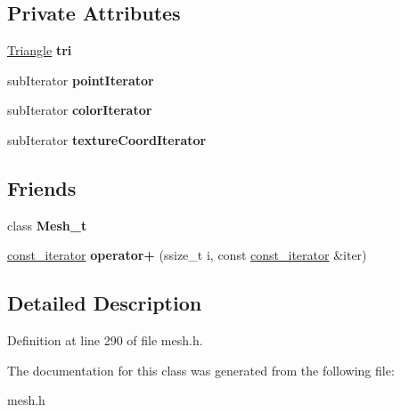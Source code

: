 \subsection*{Private Attributes}
\begin{DoxyCompactItemize}
\item 
\hypertarget{classMesh__t_1_1const__iterator_aa0ff7c5e1b1f15e37f6bf47ae48813bc}{\hyperlink{structTriangle}{Triangle} {\bfseries tri}}\label{classMesh__t_1_1const__iterator_aa0ff7c5e1b1f15e37f6bf47ae48813bc}

\item 
\hypertarget{classMesh__t_1_1const__iterator_a956eff916034727260807fc25547ad26}{sub\+Iterator {\bfseries point\+Iterator}}\label{classMesh__t_1_1const__iterator_a956eff916034727260807fc25547ad26}

\item 
\hypertarget{classMesh__t_1_1const__iterator_ac96c04ebda6b049fc2cf54662998760a}{sub\+Iterator {\bfseries color\+Iterator}}\label{classMesh__t_1_1const__iterator_ac96c04ebda6b049fc2cf54662998760a}

\item 
\hypertarget{classMesh__t_1_1const__iterator_a995d3fea982ee9db95e52ac52eba1629}{sub\+Iterator {\bfseries texture\+Coord\+Iterator}}\label{classMesh__t_1_1const__iterator_a995d3fea982ee9db95e52ac52eba1629}

\end{DoxyCompactItemize}
\subsection*{Friends}
\begin{DoxyCompactItemize}
\item 
\hypertarget{classMesh__t_1_1const__iterator_a84c47c5327343f1dfe4c78205c3d2941}{class {\bfseries Mesh\+\_\+t}}\label{classMesh__t_1_1const__iterator_a84c47c5327343f1dfe4c78205c3d2941}

\item 
\hypertarget{classMesh__t_1_1const__iterator_ad74c50fdf0b856c3b675b50670526fc8}{\hyperlink{classMesh__t_1_1const__iterator}{const\+\_\+iterator} {\bfseries operator+} (ssize\+\_\+t i, const \hyperlink{classMesh__t_1_1const__iterator}{const\+\_\+iterator} \&iter)}\label{classMesh__t_1_1const__iterator_ad74c50fdf0b856c3b675b50670526fc8}

\end{DoxyCompactItemize}


\subsection{Detailed Description}


Definition at line 290 of file mesh.\+h.



The documentation for this class was generated from the following file\+:\begin{DoxyCompactItemize}
\item 
mesh.\+h\end{DoxyCompactItemize}
